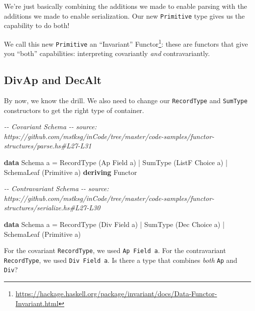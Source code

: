 \documentclass[]{article}
\newenvironment{Shaded}{}{}
\newcommand{\CommentTok}[1]{\textcolor[rgb]{0.38,0.63,0.69}{\textit{#1}}}
\newcommand{\DataTypeTok}[1]{\textcolor[rgb]{0.56,0.13,0.00}{#1}}
\newcommand{\KeywordTok}[1]{\textcolor[rgb]{0.00,0.44,0.13}{\textbf{#1}}}
\newcommand{\NormalTok}[1]{#1}
\newcommand{\OperatorTok}[1]{\textcolor[rgb]{0.40,0.40,0.40}{#1}}
\newcommand{\OtherTok}[1]{\textcolor[rgb]{0.00,0.44,0.13}{#1}}
\renewcommand{\href}[2]{#2\footnote{\url{#1}}}
\begin{document}
We're just basically combining the additions we made to enable parsing with the
additions we made to enable serialization. Our new \texttt{Primitive} type gives
us the capability to do both!

We call this new \texttt{Primitive} an
\href{https://hackage.haskell.org/package/invariant/docs/Data-Functor-Invariant.html}{``Invariant''
Functor}: these are functors that give you ``both'' capabilities: interpreting
covariantly \emph{and} contravariantly.

\hypertarget{divap-and-decalt}{%
\subsection{DivAp and DecAlt}\label{divap-and-decalt}}

By now, we know the drill. We also need to change our \texttt{RecordType} and
\texttt{SumType} constructors to get the right type of container.

\begin{Shaded}
\begin{Highlighting}[]
\CommentTok{{-}{-} Covariant Schema}
\CommentTok{{-}{-} source: https://github.com/mstksg/inCode/tree/master/code{-}samples/functor{-}structures/parse.hs\#L27{-}L31}

\KeywordTok{data} \DataTypeTok{Schema}\NormalTok{ a }\OtherTok{=}
      \DataTypeTok{RecordType}\NormalTok{  (}\DataTypeTok{Ap} \DataTypeTok{Field}\NormalTok{ a)}
    \OperatorTok{|} \DataTypeTok{SumType}\NormalTok{     (}\DataTypeTok{ListF} \DataTypeTok{Choice}\NormalTok{ a)}
    \OperatorTok{|} \DataTypeTok{SchemaLeaf}\NormalTok{  (}\DataTypeTok{Primitive}\NormalTok{ a)}
  \KeywordTok{deriving} \DataTypeTok{Functor}

\CommentTok{{-}{-} Contravariant Schema}
\CommentTok{{-}{-} source: https://github.com/mstksg/inCode/tree/master/code{-}samples/functor{-}structures/serialize.hs\#L27{-}L30}

\KeywordTok{data} \DataTypeTok{Schema}\NormalTok{ a }\OtherTok{=}
      \DataTypeTok{RecordType}\NormalTok{  (}\DataTypeTok{Div} \DataTypeTok{Field}\NormalTok{ a)}
    \OperatorTok{|} \DataTypeTok{SumType}\NormalTok{     (}\DataTypeTok{Dec} \DataTypeTok{Choice}\NormalTok{ a)}
    \OperatorTok{|} \DataTypeTok{SchemaLeaf}\NormalTok{  (}\DataTypeTok{Primitive}\NormalTok{ a)}
\end{Highlighting}
\end{Shaded}

For the covariant \texttt{RecordType}, we used \texttt{Ap\ Field\ a}. For the
contravariant \texttt{RecordType}, we used \texttt{Div\ Field\ a}. Is there a
type that combines \emph{both} \texttt{Ap} and \texttt{Div}?
\end{document}
